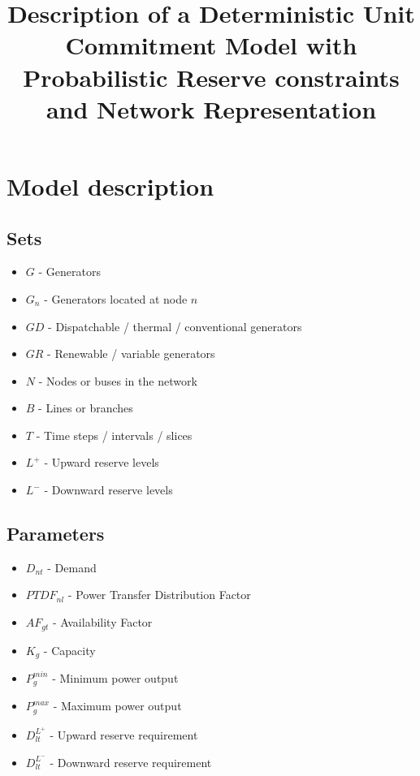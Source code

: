 \documentclass[number,times]{elsarticle}
\begin{document}
\title{Description of a Deterministic Unit Commitment Model with Probabilistic Reserve constraints and Network Representation}

\maketitle

\newpage

\tableofcontents

\newpage

\section{Model description}

\subsection{Sets}

\begin{itemize}
    \item $G$ - Generators
    \item $G_n$ - Generators located at node $n$
    \item $GD$ - Dispatchable / thermal / conventional generators
    \item $GR$ - Renewable / variable generators
    \item $N$ - Nodes or buses in the network
    \item $B$ - Lines or branches
    \item $T$ - Time steps / intervals / slices
    \item $L^+$ - Upward reserve levels
    \item $L^-$ - Downward reserve levels
\end{itemize}

\subsection{Parameters}

\begin{itemize}
    \item $D_{nt}$ - Demand
    \item $PTDF_{nl}$ - Power Transfer Distribution Factor
    \item $AF_{gt}$ - Availability Factor
    \item $K_g$ - Capacity
    \item $P^{min}_g$ - Minimum power output
    \item $P^{max}_g$ - Maximum power output
    \item $D^{L^+}_{lt}$ - Upward reserve requirement
    \item $D^{L^-}_{lt}$ - Downward reserve requirement
\end{itemize}
\end{document}
